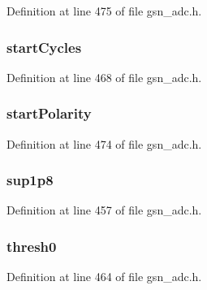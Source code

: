 Definition at line 475 of file gsn\_\-adc.h.

\hypertarget{a00023_a73879b0147fa5bccf8426e7ed992152c}{
\subsubsection[{startCycles}]{ {\bf startCycles}}}
\label{a00023_a73879b0147fa5bccf8426e7ed992152c}


Definition at line 468 of file gsn\_\-adc.h.

\hypertarget{a00023_a54eafd5eda44389c4f6b5c87ca3cfcdc}{
\subsubsection[{startPolarity}]{ {\bf startPolarity}}}
\label{a00023_a54eafd5eda44389c4f6b5c87ca3cfcdc}


Definition at line 474 of file gsn\_\-adc.h.

\hypertarget{a00023_a3414254e0076bc624e0d9343307efbbf}{
\subsubsection[{sup1p8}]{ {\bf sup1p8}}}
\label{a00023_a3414254e0076bc624e0d9343307efbbf}


Definition at line 457 of file gsn\_\-adc.h.

\hypertarget{a00023_ad1b0e41c7d61cf5641accdee6717ea86}{
\subsubsection[{thresh0}]{ {\bf thresh0}}}
\label{a00023_ad1b0e41c7d61cf5641accdee6717ea86}


Definition at line 464 of file gsn\_\-adc.h.

